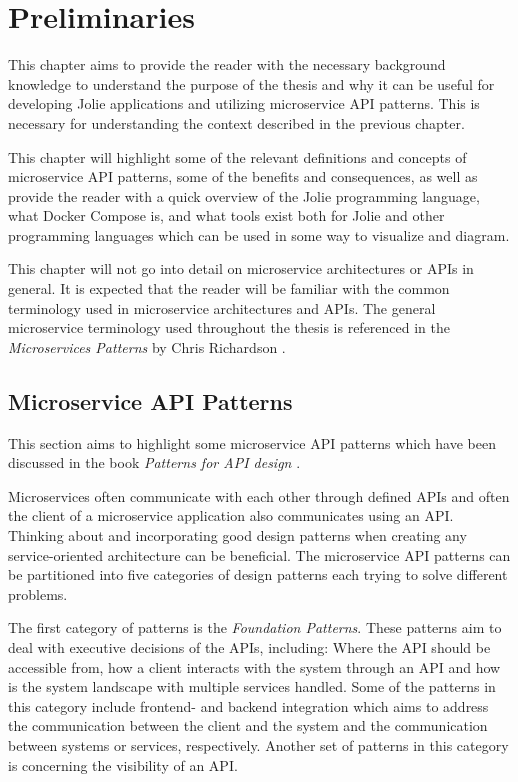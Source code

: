 \chapter{Preliminaries}
This chapter aims to provide the reader with the necessary background knowledge
to understand the purpose of the thesis and why it can be useful for developing Jolie applications and utilizing
microservice API patterns. This is necessary for understanding the context described in the previous chapter.

This chapter will highlight some of the relevant definitions and concepts of microservice API patterns, some of the benefits and consequences, as
 well as provide
the reader with a quick overview of the Jolie programming language,
what Docker Compose is, and what tools exist both for Jolie and
other programming languages which can be used in some way to visualize and diagram.

This chapter will not go into detail on microservice architectures or APIs in general. It is
expected that the reader will be familiar with the common terminology used in microservice architectures and APIs.
The general microservice terminology used throughout the thesis is referenced in the \emph{Microservices Patterns} by Chris Richardson \cite{microservicepatterns}.

\section{Microservice API Patterns}
This section aims to highlight some microservice API patterns which have been discussed in the book \emph{Patterns for API design} \cite{PatternsForAPIDesign:2022}.

Microservices often communicate with each other through defined APIs and often the client of a microservice application also communicates using an API.
Thinking about and incorporating good design patterns when creating any service-oriented architecture can be beneficial.
The microservice API patterns can be partitioned into five categories of design patterns each trying to solve different problems.

The first category of patterns is the \emph{Foundation Patterns}. These patterns aim to deal with executive decisions of the APIs, including: Where the API should be
accessible from, how a client interacts with the system through an API and how is the system landscape with multiple services handled. Some of the patterns in this category include frontend- and backend integration which aims
to address the communication between the client and the system and the communication between systems or services, respectively. Another set of patterns in this category is concerning the visibility of an API.

